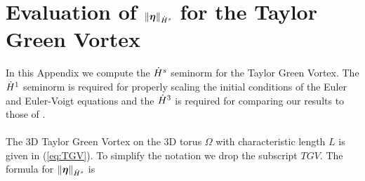 \chapter{Evaluation of $\|{\boldsymbol \eta}\|_{\dot{H}^s}$ for the Taylor Green Vortex}
\label{app:tg:seminorm:general}

{\color{red}
In this Appendix we {\color{red}compute} the $\dot{H}^s$ seminorm for the Taylor Green Vortex. The $\dot{H}^1$ seminorm is required for properly scaling the initial conditions of the Euler and Euler-Voigt equations and the $\dot{H}^3$ is required for comparing our results to those of \cite{zhao_systematic_2023}.
\\~\\
The 3D Taylor Green Vortex on the 3D torus $\Omega$ with characteristic length $L$ is given in (\ref{eq:TGV}). To simplify the notation we drop the subscript $TGV$. The formula for $\|{\boldsymbol \eta}\|_{\dot{H}^s}$ is

}
